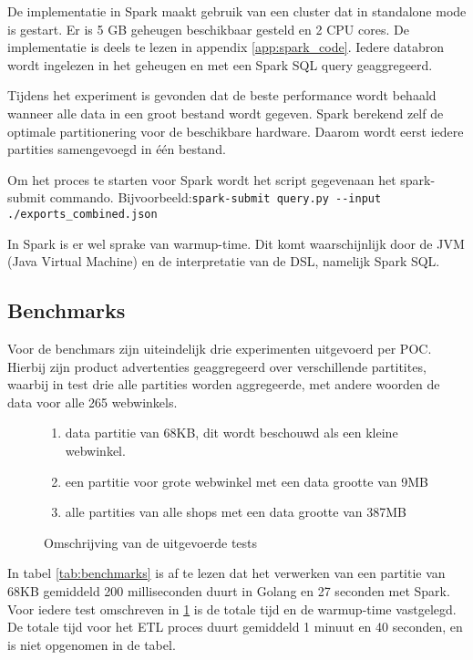 De implementatie in Spark maakt gebruik van een cluster dat in standalone mode is gestart. Er is 5 GB geheugen beschikbaar gesteld en 2 CPU cores. De implementatie is deels te lezen in appendix \ref{app:spark_code}. Iedere databron wordt ingelezen in het geheugen en met een Spark SQL query geaggregeerd.

Tijdens het experiment is gevonden dat de beste performance wordt behaald wanneer alle data in een groot bestand wordt gegeven. Spark berekend zelf de optimale partitionering voor de beschikbare hardware. Daarom wordt eerst iedere partities samengevoegd in één bestand.

Om het proces te starten voor Spark wordt het script gegevenaan het spark-submit commando. Bijvoorbeeld:\newline\verb+spark-submit query.py --input ./exports_combined.json+

In Spark is er wel sprake van warmup-time. Dit komt waarschijnlijk door de JVM (Java Virtual Machine) en de interpretatie van de DSL, namelijk Spark SQL.

\subsection{Benchmarks}

Voor de benchmars zijn uiteindelijk drie experimenten uitgevoerd per POC. Hierbij zijn product advertenties geaggregeerd over verschillende partitites, waarbij in test drie alle partities worden aggregeerde, met andere woorden de data voor alle 265 webwinkels.

\begin{figure}[h]
\caption{Omschrijving van de uitgevoerde tests}
\label{fig:test}
\begin{enumerate}
    \item data partitie van 68KB, dit wordt beschouwd als een kleine webwinkel.
    \item een partitie voor grote webwinkel met een data grootte van 9MB
    \item alle partities van alle shops met een data grootte van 387MB
\end{enumerate}
\end{figure}

In tabel \ref{tab:benchmarks} is af te lezen dat het verwerken van een partitie van 68KB gemiddeld 200 milliseconden duurt in Golang en 27 seconden met Spark. Voor iedere test omschreven in \ref{fig:test} is de totale tijd en de warmup-time vastgelegd. De totale tijd voor het ETL proces duurt gemiddeld 1 minuut en 40 seconden, en is niet opgenomen in de tabel.

